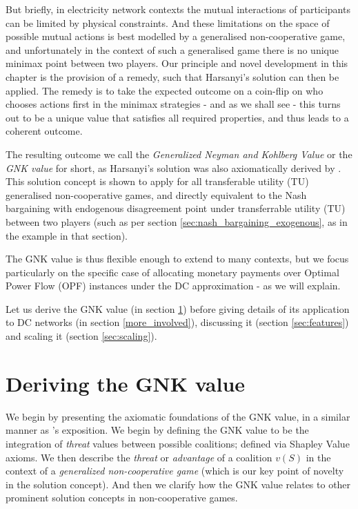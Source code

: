 But briefly, in electricity network contexts the mutual interactions of participants can be limited by physical constraints.
And these limitations on the space of possible mutual actions is best modelled by a generalised non-cooperative game, and unfortunately in the context of such a generalised game there is no unique minimax point between two players.
Our principle and novel development in this chapter is the provision of a remedy, such that Harsanyi's solution can then be applied.
The remedy is to take the expected outcome on a coin-flip on who chooses actions first in the minimax strategies - and as we shall see - this turns out to be a unique value that satisfies all required properties, and thus leads to a coherent outcome.

The resulting outcome we call the \textit{Generalized Neyman and Kohlberg Value} or the \textit{GNK value} for short, 
as Harsanyi's solution was also axiomatically derived by \cite{value2,KOHLBERG2018139}.
This solution concept is shown to apply for all transferable utility (TU) generalised non-cooperative games, and directly equivalent to the Nash bargaining with endogenous disagreement point under transferrable utility (TU) between two players (such as per section \ref{sec:nash_bargaining_exogenous}, as in the example in that section).

The GNK value is thus flexible enough to extend to many contexts, but we focus particularly on the specific case of allocating monetary payments over Optimal Power Flow (OPF) instances under the DC approximation - as we will explain.

Let us derive the GNK value (in section \ref{the_value_def2}) before giving details of its application to DC networks (in section \ref{more_involved}), discussing it (section \ref{sec:features}) and scaling it (section \ref{sec:scaling}).

\section{Deriving the GNK value}\label{the_value_def2}

We begin by presenting the axiomatic foundations of the GNK value, in a similar manner as \cite{value2}'s exposition.
We begin by defining the GNK value to be the integration of \emph{threat} values between possible coalitions; defined via Shapley Value axioms.
We then describe the \emph{threat} or \emph{advantage} of a coalition $v(S)$ in the context of a \textit{generalized non-cooperative game} (which is our key point of novelty in the solution concept).
And then we clarify how the GNK value relates to other prominent solution concepts in non-cooperative games.

